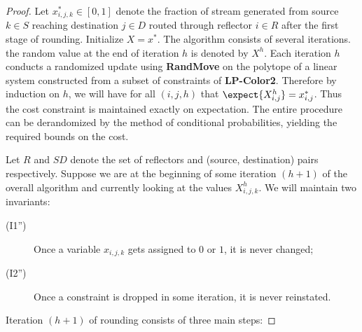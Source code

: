 \begin{proof}
Let $x^{*}_{i,j,k} \in [0,1]$ denote the fraction of stream generated from source $k \in S$ reaching destination
$j \in D$ routed through reflector $i \in R$ after the first stage of rounding. Initialize $X=x^*$. The algorithm
consists of several iterations. the random value at the end of iteration $h$ is denoted by $X^{h}$. Each iteration $h$ conducts a randomized update using {\bf RandMove} on the polytope of a linear system constructed from a subset of constraints of {\bf LP-Color2}. Therefore by induction on $h$, we will have for all $(i,j,h)$ that $\expect{X_{i,j}^{h}}=x^{*}_{i,j}$. Thus the cost constraint is maintained exactly on expectation. The entire procedure can be derandomized by the method of conditional probabilities, yielding the required bounds on the cost.

Let $R$ and $SD$ denote the set of reflectors and (source, destination) pairs respectively.
Suppose we are at the beginning of some iteration $(h+1)$ of the overall algorithm and currently looking
at the values $X_{i,j,k}^{h}$. We will maintain two invariants:
\begin{description}
\item[(I1'')] Once a variable $x_{i,j,k}$ gets assigned to $0$ or $1$, it is never changed;
\item[(I2'')] Once a constraint is dropped in some iteration, it is never reinstated.
\end{description}
Iteration $(h+1)$ of rounding consists of three main steps:


\end{proof}
